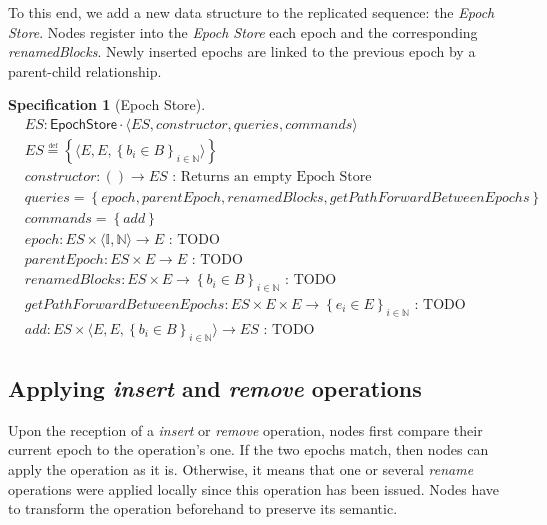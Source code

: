 \documentclass{article}
\newcommand{\commands}[1]{commands = \set{#1}}
\newcommand{\defeq}{\overset{\underset{\mathrm{def}}{}}{=}}
\newcommand{\fnspec}[3]{#1: #2 \text{ : #3}}
\newcommand{\inbb}[1]{\in \mathbb{#1}}
\newcommand{\mathlist}[2]{\set{#1_i \in #2}_{i \inbb{N}}}
\newcommand{\queries}[1]{queries = \set{#1}}
\newcommand{\set}[1]{\left\{#1\right\}} %
\newcommand{\spectuple}[1]{\tuple{#1, constructor, queries, commands}}
\newcommand{\ssep}{\mid} %
\newcommand{\tuple}[1]{\langle #1 \rangle}
\theoremstyle{definition}
\newtheorem{specification}{Specification}
\begin{document}
To this end, we add a new data structure to the replicated sequence: the \emph{Epoch Store}.
Nodes register into the \emph{Epoch Store} each epoch and the corresponding \emph{renamedBlocks}.
Newly inserted epochs are linked to the previous epoch by a parent-child relationship.

\begin{specification}[Epoch Store]
    \begin{align*}
    &ES: \mathsf{EpochStore} \cdot \spectuple{ES}\\
    &ES \defeq \set{\tuple{E, E, \mathlist{b}{B}}}\\
    &\fnspec{constructor}{() \to ES}{Returns an empty Epoch Store}\\
    &\queries{epoch, parentEpoch, renamedBlocks, getPathForwardBetweenEpochs}\\
    &\commands{add}\\
    &\fnspec{epoch}{ES \times \tuple{\mathbb{I}, \mathbb{N}} \to E}{TODO}\\
    &\fnspec{parentEpoch}{ES \times E \to E}{TODO}\\
    &\fnspec{renamedBlocks}{ES \times E \to \mathlist{b}{B}}{TODO}\\
    &\fnspec{getPathForwardBetweenEpochs}{ES \times E \times E \to \mathlist{e}{E}}{TODO}\\
    &\fnspec{add}{ES \times \tuple{E, E, \mathlist{b}{B}} \to ES}{TODO}
    \end{align*}
    \label{spec:epoch-store}
\end{specification}

\subsection{Applying \emph{insert} and \emph{remove} operations}

Upon the reception of a \emph{insert} or \emph{remove} operation, nodes first compare their current epoch to the operation's one.
If the two epochs match, then nodes can apply the operation as it is.
Otherwise, it means that one or several \emph{rename} operations were applied locally since this operation has been issued.
Nodes have to transform the operation beforehand to preserve its semantic.
\end{document}
